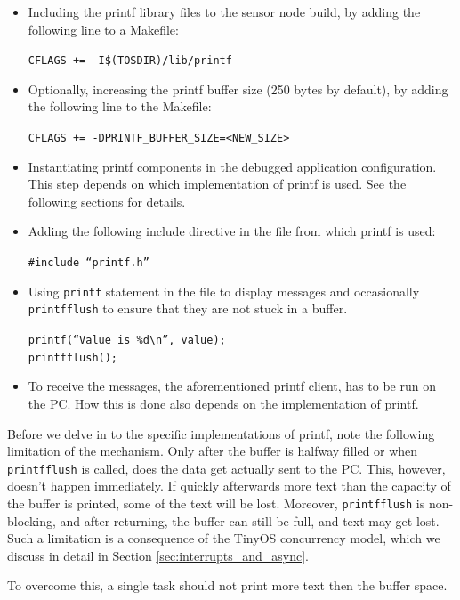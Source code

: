 \begin{itemize}
  \item Including the printf library files to the sensor node  build, by adding the following line to a Makefile:

    \texttt{CFLAGS += -I\$(TOSDIR)/lib/printf}

  \item Optionally, increasing the printf buffer size (250 bytes by default), by adding the following line to the Makefile:

    \texttt{CFLAGS += -DPRINTF\_BUFFER\_SIZE=<NEW\_SIZE>}

  \item Instantiating printf components in the debugged application configuration. This step depends on which implementation of printf is used. See the following sections for details.

  \item Adding the following include directive in the file from which printf is used:

    \texttt{\#include ``printf.h''}

  \item Using \texttt{printf} statement in the file to display messages and occasionally \texttt{printfflush} to ensure that they are not stuck in a buffer.

    \texttt{printf(``Value is \%d\textbackslash n'', value);} \\
    \texttt{printfflush();}

  \item To receive the messages, the aforementioned printf client, has to be run on the PC. How this is done also depends on the implementation of printf.
\end{itemize}

Before we delve in to the specific implementations of printf, note the following limitation of the mechanism. Only after the buffer is halfway filled or when \texttt{printfflush} is called, does the data get actually sent to the PC. This, however, doesn't happen immediately. If quickly afterwards more text than the capacity of the buffer is printed, some of the text will be lost. Moreover, \texttt{printfflush} is non-blocking, and after returning, the buffer can still be full, and text may get lost. Such a limitation is a consequence of the TinyOS concurrency model, which we discuss in detail in Section \ref{sec:interrupts_and_async}.

To overcome this, a single task should not print more text then the buffer space.

